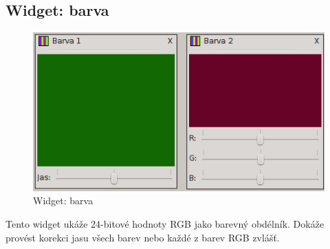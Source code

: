 \documentclass[12pt, a4paper, oneside]{article}
\begin{document}
\subsection{Widget: barva}
\begin{figure}[H]
\begin{center}
\includegraphics{img/w_col.png}
\caption{Widget: barva}
\end{center}
\end{figure}
Tento widget ukáže 24-bitové hodnoty RGB jako barevný obdélník. Dokáže provést korekci jasu všech barev nebo každé z barev RGB zvlášť.

\newpage
\end{document}
